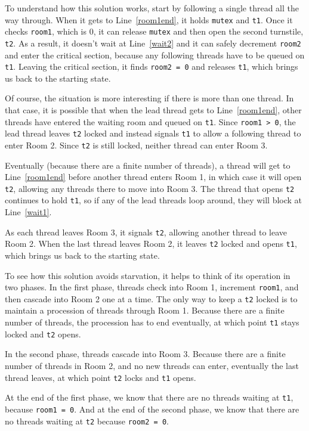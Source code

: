 \documentclass{book}
\begin{document}
To understand how this solution works, start by following a single
thread all the way through.  When it gets to Line~\ref{room1end}, it
holds {\tt mutex} and {\tt t1}.  Once it checks {\tt room1}, which is
0, it can release {\tt mutex} and then open the second turnstile, {\tt
t2}.  As a result, it doesn't wait at Line~\ref{wait2} and it can
safely decrement {\tt room2} and enter the critical section, because
any following threads have to be queued on {\tt t1}.  Leaving the
critical section, it finds {\tt room2 = 0} and releases {\tt t1},
which brings us back to the starting state.

Of course, the situation is more interesting if there is more than one
thread.  In that case, it is possible that when the lead thread gets
to Line~\ref{room1end}, other threads have entered the waiting room
and queued on {\tt t1}.  Since {\tt room1 > 0}, the lead thread leaves
{\tt t2} locked and instead signals {\tt t1} to allow a following
thread to enter Room 2.  Since {\tt t2} is still locked, neither
thread can enter Room 3.

Eventually (because there are a finite number of threads), a thread
will get to Line~\ref{room1end} before another thread enters Room 1, in which
case it will open {\tt t2}, allowing any threads there to move into
Room 3.  The thread that opens {\tt t2} continues to hold {\tt t1}, so
if any of the lead threads loop around, they will block at Line~\ref{wait1}.

As each thread leaves Room 3, it signals {\tt t2}, allowing another
thread to leave Room 2.  When the last thread leaves Room 2, it leaves
{\tt t2} locked and opens {\tt t1}, which brings us back to the
starting state.

To see how this solution avoids starvation, it helps to think of its
operation in two phases.  In the first phase, threads check into Room
1, increment {\tt room1}, and then cascade into Room 2 one at a time.
The only way to keep a {\tt t2} locked is to maintain a
procession of threads through Room 1.  Because there are a finite
number of threads, the procession has to end eventually, at which
point {\tt t1} stays locked and {\tt t2} opens.

In the second phase, threads cascade into Room 3.  
Because there are a finite number of threads in Room 2, and
no new threads can enter, eventually the last thread leaves, at
which point {\tt t2} locks and {\tt t1} opens.

At the end of the first phase, we know that there are no threads
waiting at {\tt t1}, because {\tt room1 = 0}.  And at the end of the
second phase, we know that there are no threads waiting at {\tt t2}
because {\tt room2 = 0}.
\end{document}
